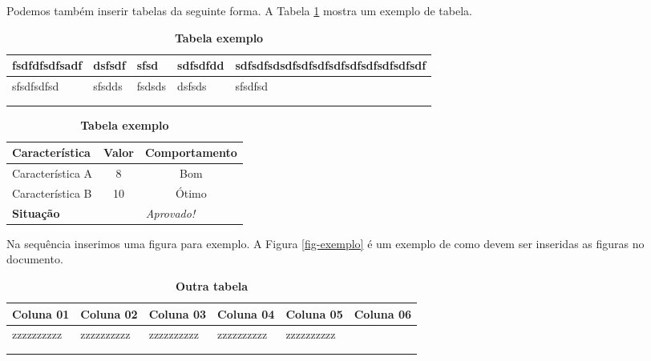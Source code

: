 \documentclass[
	12pt,				%
	openright,			%
	oneside,			%
	a4paper,			%
	chapter=TITLE,		%
	section=TITLE,		%
	english,			%
	french,				%
	spanish,			%
	brazil				%
	]{abntex2}
\begin{document}
Podemos também inserir tabelas da seguinte forma. A Tabela \ref{tab-exemplo} mostra um exemplo de tabela.

\begin{table}[!h]
\center\scriptsize
\caption{\textbf{Tabela exemplo}}
\begin{tabular}{|l|l|l|l|l|}
\hline
fsdfdfsdfsadf & dsfsdf & sfsd   & sdfsdfdd & sdfsdfsdsdfsdfsdfsdfsdfsdfsdfsdfsdf \\ \hline
sfsdfsdfsd    & sfsdds & fsdsds & dsfsds   & sfsdfsd                             \\ \hline
              &        &        &          &                                     \\ \hline
              &        &        &          &                                     \\ \hline
\end{tabular}
\end{table}

\begin{table}[!h]
\center\scriptsize
\caption{\textbf{Tabela exemplo}}
\begin{tabular}{|l|c|c|} \hline \label{tab-exemplo}
\textbf{ Característica}	& \textbf{Valor} 	& \textbf{ Comportamento} \\ \hline
Característica A 		& 8			& Bom \\ \hline
Característica B		& 10			&Ótimo \\ \hline
\textbf{Situação}		& \multicolumn{2}{c|}{\textit{Aprovado!}} \\ \hline
\end{tabular}
\end{table}



Na sequência inserimos uma figura para exemplo. A Figura \ref{fig-exemplo} é um exemplo de como devem ser inseridas as figuras no documento.

\begin{table}[!htb]
\center\scriptsize
\caption{\textbf{Outra tabela}}
\begin{tabular}{|l|l|l|l|l|l|}
\hline \label{outra-tab}
Coluna 01  & Coluna 02  & Coluna 03  & Coluna 04  & Coluna 05  & Coluna 06 \\ \hline
zzzzzzzzzz & zzzzzzzzzz & zzzzzzzzzz & zzzzzzzzzz & zzzzzzzzzz &           \\ \hline
           &            &            &            &            &           \\ \hline
           &            &            &            &            &           \\ \hline
\end{tabular}
\end{table}
\end{document}

